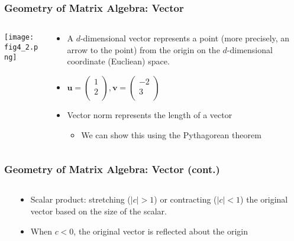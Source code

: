\documentclass[pdflatex, 12pt]{beamer}
\begin{document}
\begin{frame}
\frametitle{Geometry of Matrix Algebra: Vector}
\begin{columns}
\begin{column}{0.5\textwidth}
\centering
\texttt{[image: fig4\_2.png]}
\end{column}
\begin{column}{0.5\textwidth}
\begin{itemize}
\item A $d$-dimensional vector represents a point (more precisely, an arrow to the point) from the origin on the $d$-dimensional coordinate (Eucliean) space.
\vspace{0.4cm}
\item $\bm{u} = \begin{pmatrix}
1 \\
2 \\
\end{pmatrix}, \bm{v} = \begin{pmatrix}
-2 \\
3 \\
\end{pmatrix}$
\vspace{0.4cm}
\item Vector norm represents the length of a vector
 \begin{itemize}
 \item We can show this using the Pythagorean theorem
 \end{itemize}
\end{itemize}
\end{column}
\end{columns}
\end{frame}

\begin{frame}
\frametitle{Geometry of Matrix Algebra: Vector (cont.)}
\begin{columns}
\begin{column}{0.5\textwidth}
\centering
{}
\end{column}
\begin{column}{0.5\textwidth}
\begin{itemize}
\item Scalar product: stretching ($|c| > 1$) or contracting ($|c| < 1$) the original vector based on the size of the scalar.
\vspace{0.4cm}
\item When $c < 0$, the original vector is reflected about the origin
\end{itemize}
\end{column}
\end{columns}
\end{frame}
\end{document}
